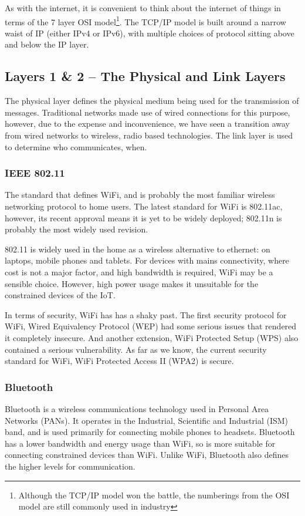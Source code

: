 \documentclass[12pt,journal,compsoc]{IEEEtran}
\begin{document}
As with the internet, it is convenient to think about the internet of things in
terms of the 7 layer OSI model\footnote{Although the TCP/IP model won the
battle, the numberings from the OSI model are still commonly used in industry}.
The TCP/IP model is built around a narrow waist of IP (either IPv4 or IPv6),
with multiple choices of protocol sitting above and below the IP layer. 

\subsection{Layers 1 \& 2 -- The Physical and Link Layers}
\label{layer_1_2}
The physical layer defines the physical medium being used for the transmission
of messages. Traditional networks made use of wired connections for this
purpose, however, due to the expense and inconvenience, we have seen a
transition away from wired networks to wireless, radio based technologies. The
link layer is used to determine who communicates, when.

\subsubsection{IEEE 802.11}
The standard that defines WiFi, and is probably the most
familiar wireless networking protocol to home users. The latest standard for
WiFi is 802.11ac, however, its recent approval means it is yet to be widely
deployed; 802.11n is probably the most widely used revision. 

802.11 is widely used in the home as a wireless alternative to ethernet: on
laptops, mobile phones and tablets. For devices with mains connectivity, where
cost is not a major factor, and high bandwidth is required, WiFi may be a
sensible choice.  However, high power usage makes it unsuitable for the
constrained devices of the IoT. 

In terms of security, WiFi has has a shaky past. The first security protocol
for WiFi, Wired Equivalency Protocol (WEP) had some serious issues that
rendered it completely insecure. And another extension, WiFi Protected
Setup (WPS) also contained a serious vulnerability. As far as we know, the
current security standard for WiFi, WiFi Protected Access II (WPA2) is
secure. 

\subsubsection{Bluetooth}
Bluetooth is a wireless communications technology used in Personal Area Networks (PANs).
It operates in the Industrial, Scientific and Industrial (ISM) band, and is
used primarily for connecting mobile phones to headsets. Bluetooth has a lower
bandwidth and energy usage than WiFi, so is more suitable for connecting
constrained devices than WiFi. Unlike WiFi, Bluetooth also defines the higher
levels for communication. 
\end{document}
